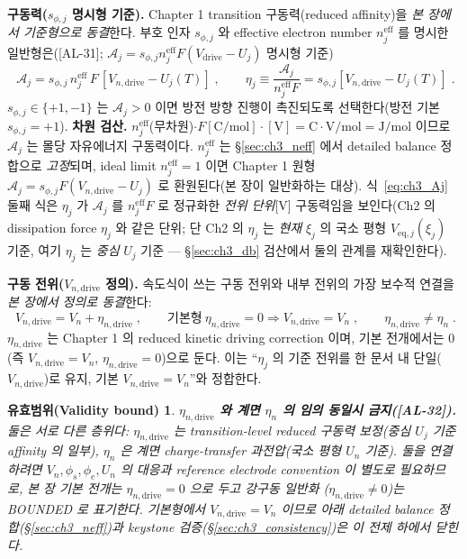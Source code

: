 \documentclass[11pt,a4paper]{article}
\newtheorem*{boundbox}{유효범위(Validity bound)}
\newcommand{\eff}{\mathrm{eff}}
\newcommand{\eq}{\mathrm{eq}}
\newcommand{\drive}{\mathrm{drive}}
\newcommand{\AL}[1]{\textsf{[AL-#1]}}
\begin{document}
\textbf{구동력($s_{\phi,j}$ 명시형 기준).} Chapter 1 transition 구동력(reduced affinity)을
\emph{본 장에서 기준형으로 동결}한다. 부호 인자 $s_{\phi,j}$ 와 effective electron number $n_j^{\eff}$ 를 명시한
일반형은(\AL{31}; $\mathcal A_j=s_{\phi,j}n_j^\eff F(V_\drive-U_j)$ 명시형 기준)
\begin{equation}
\boxed{\;\mathcal A_j=s_{\phi,j}\,n_j^{\eff}\,F\,[V_{n,\drive}-U_j(T)]\;,\qquad \eta_j\equiv\frac{\mathcal A_j}{n_j^{\eff}F}=s_{\phi,j}[V_{n,\drive}-U_j(T)]\;.}
\label{eq:ch3_Aj}
\end{equation}
$s_{\phi,j}\in\{+1,-1\}$ 는 $\mathcal A_j>0$ 이면 방전 방향 진행이 촉진되도록 선택한다(방전 기본 $s_{\phi,j}=+1$).
\textbf{차원 검산.} $n_j^{\eff}$(무차원)$\cdot F[\mathrm{C/mol}]\cdot[\mathrm V]=\mathrm{C\cdot V/mol}=\mathrm{J/mol}$
이므로 $\mathcal A_j$ 는 몰당 자유에너지 구동력이다. $n_j^{\eff}$ 는 \S\ref{sec:ch3_neff} 에서 detailed balance
정합으로 \emph{고정}되며, ideal limit $n_j^{\eff}=1$ 이면 Chapter 1 원형 $\mathcal A_j=s_{\phi,j}F(V_{n,\drive}-U_j)$
로 환원된다(본 장이 일반화하는 대상). 식~\eqref{eq:ch3_Aj} 둘째 식은 $\eta_j$ 가 $\mathcal A_j$ 를 $n_j^\eff F$
로 정규화한 \emph{전위 단위}[V] 구동력임을 보인다(Ch2 의 dissipation force $\eta_j$ 와 같은 단위; 단 Ch2 의
$\eta_j$ 는 \emph{현재} $\xi_j$ 의 국소 평형 $V_{\eq,j}(\xi_j)$ 기준, 여기 $\eta_j$ 는 \emph{중심} $U_j$ 기준
— \S\ref{sec:ch3_db} 검산에서 둘의 관계를 재확인한다).

\textbf{구동 전위($V_{n,\drive}$ 정의).} 속도식이 쓰는 구동 전위와 내부 전위의 가장 보수적
연결을 \emph{본 장에서 정의로 동결}한다:
\begin{equation}
\boxed{\;V_{n,\drive}=V_n+\eta_{n,\drive}\;,\qquad \text{기본형}\ \eta_{n,\drive}=0\Rightarrow V_{n,\drive}=V_n\;,\qquad \eta_{n,\drive}\ne\eta_n\;.}
\label{eq:ch3_drive}
\end{equation}
$\eta_{n,\drive}$ 는 Chapter 1 의 reduced kinetic driving correction 이며, 기본 전개에서는 $0$(즉
$V_{n,\drive}=V_n$, $\eta_{n,\drive}=0$)으로 둔다. 이는 ``$\eta_j$ 의 기준 전위를 한
문서 내 단일($V_{n,\drive}$)로 유지, 기본 $V_{n,\drive}=V_n$''와 정합한다.
\begin{boundbox}
\textbf{$\eta_{n,\drive}$ 와 계면 $\eta_n$ 의 임의 동일시 금지(\AL{32}).} 둘은 \emph{서로 다른 층위}다:
$\eta_{n,\drive}$ 는 transition-level reduced 구동력 보정(중심 $U_j$ 기준 affinity 의 일부), $\eta_n$ 은
계면 charge-transfer 과전압(국소 평형 $U_n$ 기준). 둘을 연결하려면 $V_n,\phi_s,\phi_e,U_n$ 의 대응과 reference
electrode convention 이 별도로 필요하므로, 본 장 기본 전개는 $\eta_{n,\drive}=0$ 으로 두고 강구동 일반화
($\eta_{n,\drive}\ne0$)는 BOUNDED 로 표기한다. 기본형에서 $V_{n,\drive}=V_n$ 이므로 아래 detailed balance
정합(\S\ref{sec:ch3_neff})과 keystone 검증(\S\ref{sec:ch3_consistency})은 \emph{이 전제 하에서} 닫힌다.
\end{boundbox}
\end{document}
